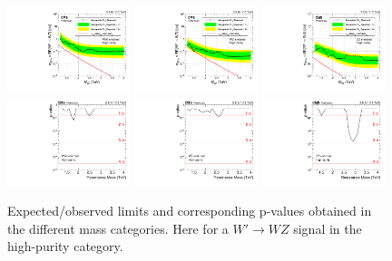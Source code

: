 \begin{figure}[h!]
\centering
\includegraphics[width=0.32\textwidth]{figures/analysis/search1/AN-15-211/limits/brazilianFlag_WZ_WWHP_13TeV_wPDF.pdf}
\includegraphics[width=0.32\textwidth]{figures/analysis/search1/AN-15-211/limits/brazilianFlag_WZ_WZHP_13TeV_wPDF.pdf}
\includegraphics[width=0.32\textwidth]{figures/analysis/search1/AN-15-211/limits/brazilianFlag_WZ_ZZHP_13TeV_wPDF.pdf}\\
\includegraphics[width=0.32\textwidth]{figures/analysis/search1/AN-15-211/pvalues/pvalue_WZinWW_high_purity.pdf}
\includegraphics[width=0.32\textwidth]{figures/analysis/search1/AN-15-211/pvalues/pvalue_WZinWZ_high_purity.pdf}
\includegraphics[width=0.32\textwidth]{figures/analysis/search1/AN-15-211/pvalues/pvalue_WZinZZ_high_purity.pdf}
\caption{Expected/observed limits and corresponding p-values obtained in the different mass categories. Here for a $W'\rightarrow WZ$ signal in the high-purity category.}
\label{fig:searchI:Limits_HPWZ}
\end{figure}


